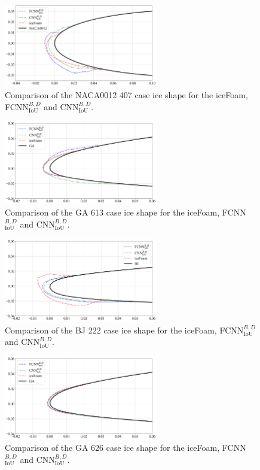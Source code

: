 \documentclass[aerospace,article,submit,moreauthors,pdftex]{Definitions/mdpi}
\begin{document}
\begin{figure}[H]
\includegraphics[width=0.6\textwidth]{Figures/407.png}
\caption{Comparison of the NACA0012 407 case ice shape for the iceFoam, FCNN$_{\text{IoU}}^{B,D}$ and CNN$_{\text{IoU}}^{B,D}$.\label{fig:407}}
\end{figure} 
\begin{figure}[H]
\includegraphics[width=0.6\textwidth]{Figures/613.png}
\caption{Comparison of the GA 613 case ice shape for the iceFoam, FCNN$_{\text{IoU}}^{B,D}$ and CNN$_{\text{IoU}}^{B,D}$.\label{fig:613}}
\end{figure} 
\begin{figure}[H]
\includegraphics[width=0.6\textwidth]{Figures/222.png}
\caption{Comparison of the BJ 222 case ice shape for the iceFoam, FCNN$_{\text{IoU}}^{B,D}$ and CNN$_{\text{IoU}}^{B,D}$.\label{fig:222}}
\end{figure} 
\begin{figure}[H]
\includegraphics[width=0.6\textwidth]{Figures/626.png}
\caption{Comparison of the GA 626 case ice shape for the iceFoam, FCNN$_{\text{IoU}}^{B,D}$ and CNN$_{\text{IoU}}^{B,D}$.\label{fig:626}}
\end{figure} 
\end{document}

